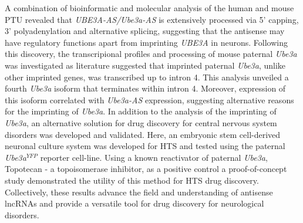 A combination of bioinformatic and molecular analysis of the human and mouse PTU revealed that \textit{UBE3A-AS/Ube3a-AS} is extensively processed via 5' capping, 3' polyadenylation and alternative splicing, suggesting that the antisense may have regulatory functions apart from imprinting \textit{UBE3A} in neurons. Following this discovery, the transcripional profiles and processing of mouse paternal \textit{Ube3a} was investigated as literature suggested that imprinted paternal \textit{Ube3a}, unlike other imprinted genes, was transcribed up to intron 4. This analysis unveiled a fourth \textit{Ube3a} isoform that terminates within intron 4. Moreover, expression of this isoform correlated with \textit{Ube3a-AS} expression, suggesting alternative reasons for the imprinting of \textit{Ube3a}. In addition to the analysis of the imprinting of \textit{Ube3a}, an alternative solution for drug discovery for central nervous system disorders was developed and validated. Here, an embryonic stem cell-derived neuronal culture system was developed for HTS and tested using the paternal \textit{Ube3a$^{YFP}$} reporter cell-line. Using a known reactivator of paternal \textit{Ube3a}, Topotecan - a topoisomerase inhibitor, as a positive control a proof-of-concept study demonstrated the utility of this method for HTS drug discovery. Collectively, these results advance the field and understanding of antisense lncRNAs and provide a versatile tool for drug discovery for neurological disorders.

\pagebreak{}
